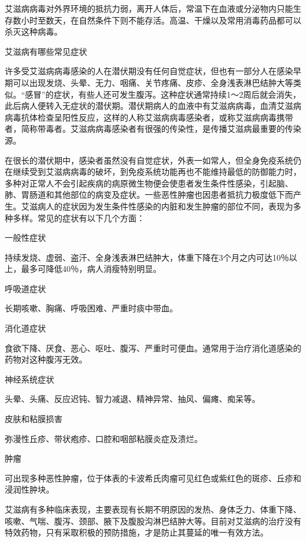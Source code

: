\documentclass[12pt,UTF8]{ctexbook}
\begin{document}
艾滋病病毒对外界环境的抵抗力弱，离开人体后，常温下在血液或分泌物内只能生存数小时至数天，在自然条件下则不能存活。高温、干燥以及常用消毒药品都可以杀灭这种病毒。





艾滋病有哪些常见症状


许多受艾滋病病毒感染的人在潜伏期没有任何自觉症状，但也有一部分人在感染早期可以出现发烧、头晕、无力、咽痛、关节疼痛、皮疹、全身浅表淋巴结肿大等类似。“感冒”的症状，有些人还可发生腹泻。这种症状通常持续1～2周后就会消失，此后病人便转入无症状的潜伏期。潜伏期病人的血液中有艾滋病病毒，血清艾滋病病毒抗体检查呈阳性反应，这样的人称艾滋病病毒感染者，或称艾滋病病毒携带者，简称带毒者。艾滋病病毒感染者有很强的传染性，是传播艾滋病最重要的传染源。

在很长的潜伏期中，感染者虽然没有自觉症状，外表一如常人，但全身免疫系统仍在继续受到艾滋病病毒的破坏，到免疫系统功能再也不能维持最低的防御能力时，多种对正常人不会引起疾病的病原微生物便会使患者发生条件性感染，引起脑、肺、胃肠道和其他部位的病变及症状。一些恶性肿瘤也因患者抵抗力极度低下而产生。艾滋病人的症状因为发生条件性感染的内脏和发生肿瘤的部位不同，表现为多种多样。常见的症状有以下几个方面：

一般性症状

持续发烧、虚弱、盗汗、全身浅表淋巴结肿大，体重下降在3个月之内可达10％以上，最多可降低40％，病人消瘦特别明显。

呼吸道症状

长期咳嗽、胸痛、呼吸困难、严重时痰中带血。

消化道症状

食欲下降、厌食、恶心、呕吐、腹泻、严重时可便血。通常用于治疗消化道感染的药物对这种腹泻无效。

神经系统症状

头晕、头痛、反应迟钝、智力减退、精神异常、抽风、偏瘫、痴呆等。

皮肤和粘膜损害

弥漫性丘疹、带状疱疹、口腔和咽部粘膜炎症及溃烂。

肿瘤

可出现多种恶性肿瘤，位于体表的卡波希氏肉瘤可见红色或紫红色的斑疹、丘疹和浸润性肿块。

艾滋病有多种临床表现，主要表现有长期不明原因的发热、身体乏力、体重下降、咳嗽、气喘、腹泻、颈部、腋下及腹股沟淋巴结肿大等。目前对艾滋病的治疗没有特效药物，只有采取积极的预防措施，才是防止其蔓延的唯一有效方法。
\end{document}
